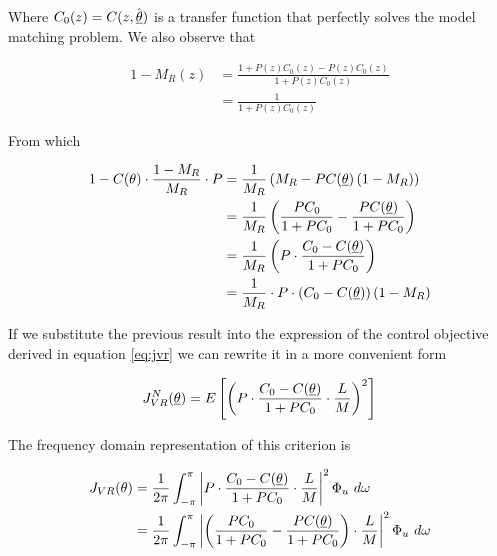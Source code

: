 Where \( C_0(z) = C(z, \hat{\underline{\theta}}) \) is a transfer function that perfectly solves the model matching problem. We also observe that 

\begin{equation}
    \begin{aligned}
        1 - M_R(z) &= \frac{1 + P(z) C_0(z) - P(z) C_0(z) }{1 + P(z) C_0(z)} \\
                 &= \frac{1}{1 + P(z)C_0(z)}
    \end{aligned}
    \label{eq:1_minus_ref_in_pc}
\end{equation}

From which

\begin{equation}
    \begin{aligned}
         1 - C(\theta) \cdot \frac{1 - M_R}{M_R} \cdot P 
            &= \frac{1}{M_R} \left( M_R - P C(\underline{\theta}) \left( 1 - M_R \right) \right) \\
            &= \frac{1}{M_R} \left( \frac{P C_0}{1 + P C_0} - \frac{P C(\underline{\theta})}{1 + P C_0} \right) \\
            &= \frac{1}{M_R} \left( P \cdot \frac{C_0 - C(\underline{\theta})}{1 + P C_0} \right) \\
            &= \frac{1}{M_R} \cdot P \cdot \left( C_0 - C(\underline{\theta}) \right) \left( 1 - M_R \right)
    \end{aligned}
\end{equation}

If we substitute the previous result into the expression of the control objective derived in equation \ref{eq:jvr} we can rewrite it in a more convenient form

\begin{equation}
    J^N_{VR}(\underline{\theta}) = E \left[ \left( P \cdot \frac{C_0 - C(\underline{\theta})}{1 + P C_0} \cdot \frac{L}{M} \right)^2 \right]
\end{equation}

The frequency domain representation of this criterion is

\begin{equation}
    \begin{aligned}
        J_{VR}(\theta) 
            &= \frac{1}{2\pi} \int_{-\pi}^{\pi} \left| P \cdot \frac{C_0 - C(\underline{\theta})}{1 + P C_0} \cdot \frac{L}{M} \right|^2 \Phi_u \ d\omega \\
            &= \frac{1}{2\pi} \int_{-\pi}^{\pi} \left| \left( \frac{PC_0}{1 + P C_0} - \frac{PC(\underline{\theta})}{1 + P C_0} \right) \cdot \frac{L}{M} \right|^2 \Phi_u \ d\omega
    \end{aligned}
\end{equation}

